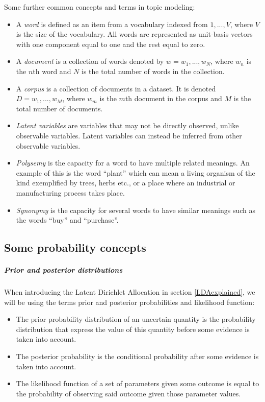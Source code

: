 \documentclass[12pt]{report}
\begin{document}
Some further common concepts and terms in topic modeling: 
\begin{itemize}
\item[] A \textit{word} is defined as an item from a vocabulary
  indexed from ${1, ..., V}$, where $V$ is the size of the
  vocabulary. All words are represented as unit-basis vectors with one
  component equal to one and the rest equal to zero.
\item[] A \textit{document} is a collection of words denoted by
  $w = {w_1, ..., w_N}$, where $w_n$ is the $n$th word and $N$ is the
  total number of words in the collection.
\item[] A \textit{corpus} is a collection of documents in a dataset.
  It is denoted $D = {w_1,..., w_M}$, where $w_m$ is the $m$th
  document in the corpus and $M$ is the total number of documents.
\item[] \textit{Latent variables} are variables that may not be directly observed, 
unlike observable variables. Latent variables can instead be inferred 
from other observable variables.
\item[] \textit{Polysemy} is the capacity for a word to have multiple related meanings. 
An example of this is the word “plant” which can mean a living organism of 
the kind exemplified by trees, herbs etc., or a place where an industrial or
manufacturing process takes place.
\item[] \textit{Synonymy} is the capacity for several words to have similar meanings such as the words “buy” and “purchase”.
\end{itemize}

\subsection{Some probability concepts}

\subparagraph{Prior and posterior distributions}

When introducing the Latent Dirichlet Allocation in section \ref{LDAexplained}, 
we will be using the terms prior and posterior probabilities
and likelihood function:

\begin{itemize}
\item The prior probability distribution of an uncertain
  quantity is the probability distribution that express the value of
  this quantity before some evidence is taken into account.
\item The posterior probability is the conditional probability after some 
evidence is taken into account.
\item The likelihood function of a set of parameters given some outcome 
is equal to the probability of observing said outcome given those 
parameter values.
\end{itemize}
\end{document}
